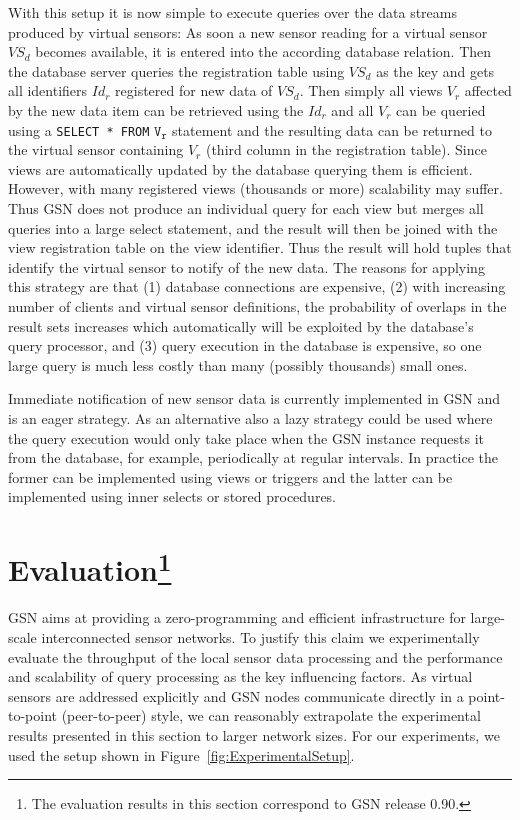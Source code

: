 With this setup it is now simple to execute queries over the data streams
produced by virtual sensors: As soon a new sensor reading for a virtual sensor
$VS_d$ becomes available, it is entered into the according database relation.
Then the database server queries the registration table using $VS_d$ as the key
and gets all identifiers $Id_r$ registered for new data of $VS_d$. Then simply
all views $V_r$ affected by the new data item can be retrieved using the $Id_r$
and all $V_r$ can be queried using a \texttt{SELECT * FROM} $\mathtt{V_r}$
statement and the resulting data can be returned to the virtual sensor
containing $V_r$ (third column in the registration table). Since views are
automatically updated by the database querying them is efficient. However, with
many registered views (thousands or more) scalability may suffer. Thus GSN does
not produce an individual query for each view but merges all queries into a
large select statement, and the result will then be joined with the view
registration table on the view identifier. Thus the result will hold tuples
that identify the virtual sensor to notify of the new data.  The reasons for
applying this strategy are that (1) database connections are expensive, (2)
with increasing number of clients and virtual sensor definitions, the
probability of overlaps in the result sets increases which automatically will
be exploited by the database's query processor, and (3) query execution in the
database is expensive, so one large query is much less costly than many
(possibly thousands) small ones.

Immediate notification of new sensor data is currently implemented in GSN and
is an eager strategy. As an alternative also a lazy strategy could be used
where the query execution would only take place when the GSN instance requests
it from the database, for example, periodically at regular intervals. In
practice the former can be implemented using views or triggers and the latter
can be implemented using inner selects or stored procedures.

\section{Evaluation\footnote{The evaluation results in this section correspond to GSN release 0.90.}}
\label{sec:evaluation}

GSN aims at providing a zero-programming and efficient infrastructure for
large-scale interconnected sensor networks. To justify this claim we
experimentally evaluate the throughput of the local sensor data processing and
the performance and scalability of query processing as the key influencing
factors.  As virtual sensors are addressed explicitly and GSN nodes communicate
directly in a point-to-point (peer-to-peer) style, we can reasonably
extrapolate the experimental results presented in this section to larger
network sizes.  For our experiments, we used the setup shown in
Figure~\ref{fig:ExperimentalSetup}.


